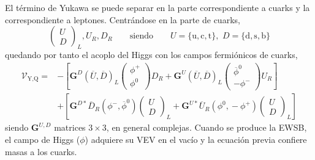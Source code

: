 El término de Yukawa se puede separar en la parte correspondiente a cuarks y la correspondiente a leptones. Centrándose en la parte de cuarks,
\begin{equation}
  \begin{pmatrix}
    U\\ D
  \end{pmatrix}_L, U_R, D_R \qquad \text{siendo} \qquad U=\{\mathrm{u,c,t}\},\,\,D=\{\mathrm{d,s,b}\}  
\end{equation}
quedando por tanto el acoplo del Higgs con los campos fermiónicos de cuarks,
\begin{equation}
\begin{split}
\mathcal{V}_{\text{Y,Q}}  = & 
- \left[\mathbf{G}^D \left(\overline{U},\!\overline{D} \right)_L \begin{pmatrix}
  \phi^+ \\ \phi^0
\end{pmatrix} D_R + 
\mathbf{G}^U \left(\overline{U},\!\overline{D} \right)_L \begin{pmatrix}
  \overline{\phi}^0 \\ -\phi^-
\end{pmatrix} U_R \right] \\ & +
%
%
\left[\mathbf{G}^{D*} \overline{D}_R\left(\phi^-,\!\overline{\phi}^0 \right) \begin{pmatrix}
  U \\ D
\end{pmatrix}_L + 
\mathbf{G}^{U*} \overline{U}_R \left(\phi^0,\!-\phi^+ \right) \begin{pmatrix}
  U \\ D
\end{pmatrix}_L \right]
\end{split}
\end{equation}
siendo $\mathbf{G}^{U,D}$ matrices $3\times3$, en general complejas. Cuando se produce la EWSB, el campo de Higgs ($\phi$) adquiere su VEV en el vacío y la ecuación previa confiere masas a los cuarks. 

